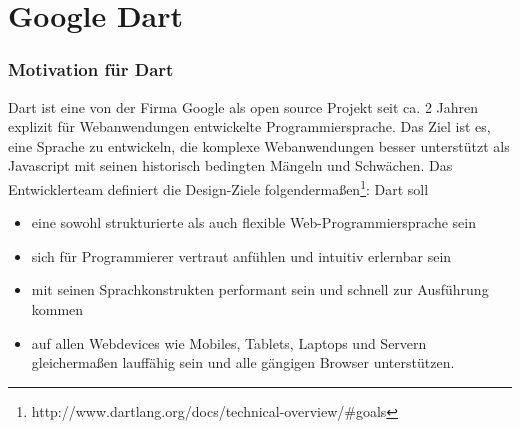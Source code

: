 \section{Google Dart}\label{s.Google Dart }

\subsubsection{Motivation für Dart}
Dart ist eine von der Firma Google als open source Projekt seit ca. 2 Jahren explizit für Webanwendungen entwickelte Programmiersprache. Das Ziel ist es, eine Sprache zu entwickeln, die komplexe Webanwendungen besser unterstützt als Javascript mit seinen historisch bedingten Mängeln und Schwächen.
Das Entwicklerteam definiert die Design-Ziele folgendermaßen\footnote{http://www.dartlang.org/docs/technical-overview/\#goals}:
Dart soll
\begin{itemize}   
\item eine sowohl strukturierte als auch flexible Web-Programmiersprache sein
\item sich für Programmierer vertraut anfühlen und intuitiv erlernbar sein 
\item mit seinen Sprachkonstrukten performant sein und schnell zur Ausführung kommen
\item auf allen Webdevices wie Mobiles, Tablets, Laptops und Servern gleichermaßen lauffähig sein und alle gängigen Browser unterstützen.
\end{itemize}

